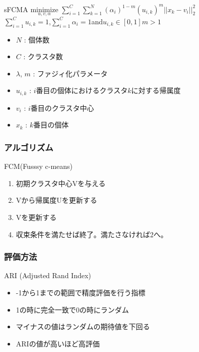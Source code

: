 \documentclass[13pt,dvipdfmx]{beamer}
\begin{document}
\begin{frame}
  \begin{block}{sFCMA}
    \quad$\underset{u,v,\alpha}{\text{minimize}}$
    $\sum_{i=1}^C\sum_{k=1}^N(\alpha_{i})^{1-m}(u_{i,k})^m||x_k-v_i||_2^2$\\
    $\sum_{i=1}^Cu_{i,k}=1$\;,\;$\sum_{i=1}^C\alpha_{i}=1$\;and\;$u_{i,k}\in[0,1]$\quad$m>1$
  \end{block}
  \begin{itemize}
    \item $N$ : 個体数
    \item $C$ : クラスタ数
    \item $\lambda$, $m$ : ファジィ化パラメータ
    \item $u_{i,k}$ : $i$番目の個体におけるクラスタ$k$に対する帰属度
    \item $v_{i}$ : $i$番目のクラスタ中心
    \item $x_{k}$ : $k$番目の個体
  \end{itemize}
\end{frame}


\begin{frame}\frametitle{アルゴリズム}
\begin{block}{FCM(Fusssy c-means)}
\begin{enumerate}
 \item 初期クラスタ中心Vを与える
 \item Vから帰属度Uを更新する
 \item Vを更新する
 \item 収束条件を満たせば終了。満たさなければ2へ。
\end{enumerate}
\end{block}
\end{frame}

\begin{frame}\frametitle{評価方法}
\begin{block}{ARI (Adjusted Rand Index)}
\begin{itemize}
 \item -1から1までの範囲で精度評価を行う指標
 \item 1の時に完全一致で0の時にランダム
 \item マイナスの値はランダムの期待値を下回る
 \item ARIの値が高いほど高評価
\end{itemize}
\end{block}
\begin{center}
\end{center}
\end{frame}
\end{document}
